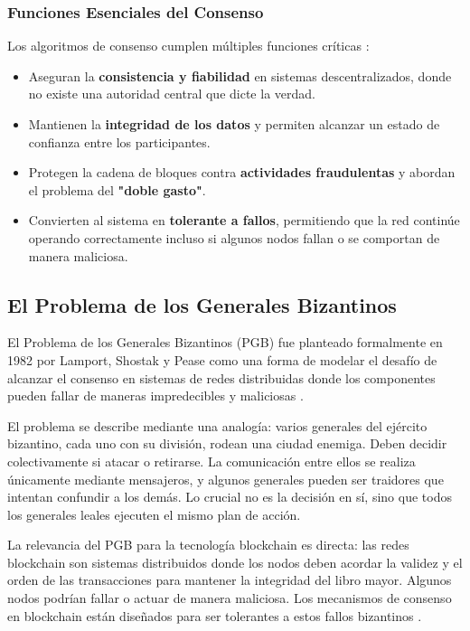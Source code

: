 \documentclass[spanish,12pt,letterpaper]{report}
\begin{document}
\subsubsection{Funciones Esenciales del Consenso}

Los algoritmos de consenso cumplen múltiples funciones críticas \parencite{crypto2025consensus}:

\begin{itemize}
    \item Aseguran la \textbf{consistencia y fiabilidad} en sistemas descentralizados, donde no existe una autoridad central que dicte la verdad.
    \item Mantienen la \textbf{integridad de los datos} y permiten alcanzar un estado de confianza entre los participantes.
    \item Protegen la cadena de bloques contra \textbf{actividades fraudulentas} y abordan el problema del \textbf{"doble gasto"}.
    \item Convierten al sistema en \textbf{tolerante a fallos}, permitiendo que la red continúe operando correctamente incluso si algunos nodos fallan o se comportan de manera maliciosa.
\end{itemize}

\subsection{El Problema de los Generales Bizantinos}

El Problema de los Generales Bizantinos (PGB) fue planteado formalmente en 1982 por Lamport, Shostak y Pease como una forma de modelar el desafío de alcanzar el consenso en sistemas de redes distribuidas donde los componentes pueden fallar de maneras impredecibles y maliciosas \parencite{amores2020blockchain}.

El problema se describe mediante una analogía: varios generales del ejército bizantino, cada uno con su división, rodean una ciudad enemiga. Deben decidir colectivamente si atacar o retirarse. La comunicación entre ellos se realiza únicamente mediante mensajeros, y algunos generales pueden ser traidores que intentan confundir a los demás. Lo crucial no es la decisión en sí, sino que todos los generales leales ejecuten el mismo plan de acción.

La relevancia del PGB para la tecnología blockchain es directa: las redes blockchain son sistemas distribuidos donde los nodos deben acordar la validez y el orden de las transacciones para mantener la integridad del libro mayor. Algunos nodos podrían fallar o actuar de manera maliciosa. Los mecanismos de consenso en blockchain están diseñados para ser tolerantes a estos fallos bizantinos \parencite{castro1999practical}.
\end{document}
